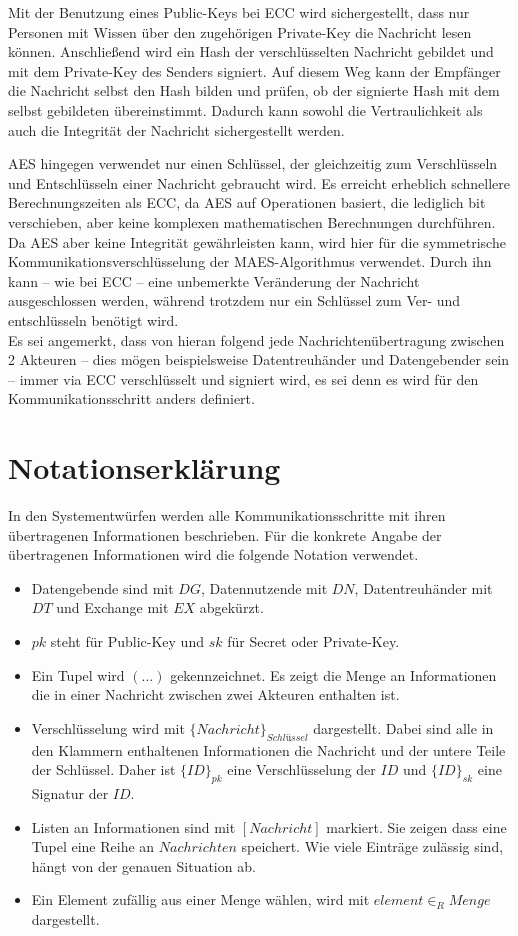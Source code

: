 \documentclass[
	fontsize=12pt,
	headings=small,
	parskip=half,           %
	bibliography=totoc,
	numbers=noenddot,       %
	open=any,               %
]{scrreprt}
\begin{document}
Mit der Benutzung eines Public-Keys bei ECC wird sichergestellt, dass nur Personen mit Wissen über den zugehörigen Private-Key die Nachricht lesen können. Anschließend wird ein Hash der verschlüsselten Nachricht gebildet und mit dem Private-Key des Senders signiert. Auf diesem Weg kann der Empfänger die Nachricht selbst den Hash bilden und prüfen, ob der signierte Hash mit dem selbst gebildeten übereinstimmt. Dadurch kann sowohl die Vertraulichkeit als auch die Integrität der Nachricht sichergestellt werden.

AES hingegen verwendet nur einen Schlüssel, der gleichzeitig zum Verschlüsseln und Entschlüsseln einer Nachricht gebraucht wird. Es erreicht erheblich schnellere Berechnungszeiten als ECC, da AES auf Operationen basiert, die lediglich bit verschieben, aber keine komplexen mathematischen Berechnungen durchführen. Da AES aber keine Integrität gewährleisten kann, wird hier für die symmetrische Kommunikationsverschlüsselung der MAES-Algorithmus verwendet. Durch ihn kann -- wie bei ECC -- eine unbemerkte Veränderung der Nachricht ausgeschlossen werden, während trotzdem nur ein Schlüssel zum Ver- und entschlüsseln benötigt wird.\\

Es sei angemerkt, dass von hieran folgend jede Nachrichtenübertragung zwischen 2 Akteuren -- dies mögen beispielsweise Datentreuhänder und Datengebender sein -- immer via ECC verschlüsselt und signiert wird, es sei denn es wird für den Kommunikationsschritt anders definiert.

\section{Notationserklärung}
In den Systementwürfen werden alle Kommunikationsschritte mit ihren übertragenen Informationen beschrieben. Für die konkrete Angabe der übertragenen Informationen wird die folgende Notation verwendet.
\begin{itemize}
    \item Datengebende sind mit $DG$, Datennutzende mit $DN$, Datentreuhänder mit $DT$ und Exchange mit $EX$ abgekürzt.
    \item $pk$ steht für Public-Key und $sk$ für Secret oder Private-Key.
    \item Ein Tupel wird $(...)$ gekennzeichnet. Es zeigt die Menge an Informationen die in einer Nachricht zwischen zwei Akteuren enthalten ist.
    \item Verschlüsselung wird mit ${\{Nachricht\}}_{Schl\textit{ü}ssel}$ dargestellt. Dabei sind alle in den Klammern enthaltenen Informationen die Nachricht und der untere Teile der Schlüssel. Daher ist ${\{ID\}}_{pk}$ eine Verschlüsselung der $ID$ und ${\{ID\}}_{sk}$ eine Signatur der $ID$.
    \item Listen an Informationen sind mit $[Nachricht]$ markiert. Sie zeigen dass eine Tupel eine Reihe an $Nachrichten$ speichert. Wie viele Einträge zulässig sind, hängt von der genauen Situation ab.
    \item Ein Element zufällig aus einer Menge wählen, wird mit $element {\in}_{R} Menge$ dargestellt.
\end{itemize}
\end{document}
